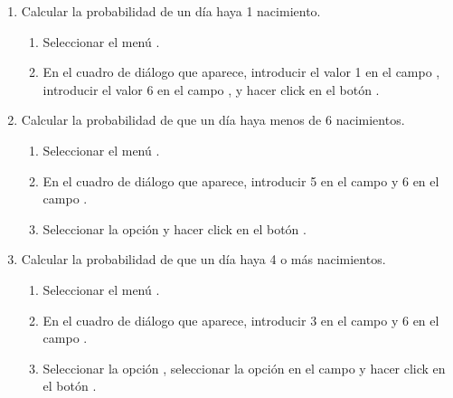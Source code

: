 \begin{enumerate}[leftmargin=*]
\begin{enumerate}
\item Calcular la probabilidad de un día haya 1 nacimiento.
\begin{indicacion}{
\begin{enumerate}
\item Seleccionar el menú .
\item En el cuadro de diálogo que aparece, introducir el valor 1 en el campo , introducir
el valor 6 en el campo , y hacer click en el botón .
\end{enumerate}}
\end{indicacion}

\item Calcular la probabilidad de que un día haya menos de 6 nacimientos.
\begin{indicacion}{
\begin{enumerate}
\item Seleccionar el menú .
\item En el cuadro de diálogo que aparece, introducir 5 en el campo  y 6 en el campo
.
\item Seleccionar la opción  y hacer click en el botón .
\end{enumerate}}
\end{indicacion}

\item Calcular la probabilidad de que un día haya 4 o más nacimientos. 
\begin{indicacion}{
\begin{enumerate}
\item Seleccionar el menú .
\item En el cuadro de diálogo que aparece, introducir 3 en el campo  y 6 en el campo
. 
\item Seleccionar la opción , seleccionar la opción  en el campo
 y hacer click en el botón .
\end{enumerate}}
\end{indicacion}


\end{enumerate}
\end{enumerate}
